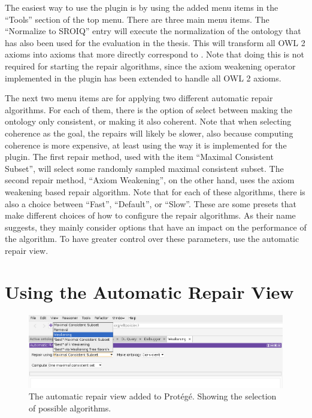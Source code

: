 The easiest way to use the plugin is by using the added menu items in the ``Tools'' section of the top menu. There are three main menu items. The ``Normalize to SROIQ'' entry will execute the normalization of the ontology that has also been used for the evaluation in the thesis. This will transform all OWL 2 axioms into axioms that more directly correspond to \SROIQ. Note that doing this is not required for starting the repair algorithms, since the axiom weakening operator implemented in the plugin has been extended to handle all OWL 2 axioms.

The next two menu items are for applying two different automatic repair algorithms. For each of them, there is the option of select between making the ontology only consistent, or making it also coherent. Note that when selecting coherence as the goal, the repairs will likely be slower, also because computing coherence is more expensive, at least using the way it is implemented for the plugin. The first repair method, used with the item ``Maximal Consistent Subset'', will select some randomly sampled maximal consistent subset. The second repair method, ``Axiom Weakening'', on the other hand, uses the axiom weakening based repair algorithm. Note that for each of these algorithms, there is also a choice between ``Fast'', ``Default'', or ``Slow''. These are some presets that make different choices of how to configure the repair algorithms. As their name suggests, they mainly consider options that have an impact on the performance of the algorithm. To have greater control over these parameters, use the automatic repair view.

\section{Using the Automatic Repair View}

\begin{figure}[htbp]
  \centering
  \includegraphics[width=\textwidth]{resources/protege-guide-algorithms.png}
  \caption{The automatic repair view added to Protégé. Showing the selection of possible algorithms.}
\end{figure}

